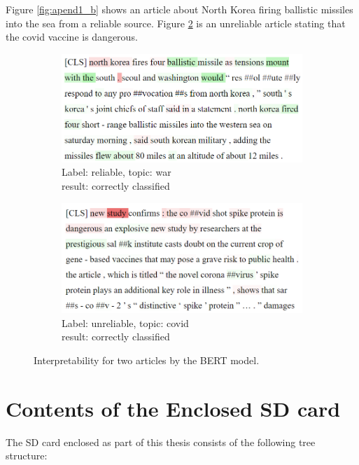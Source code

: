 Figure \ref{fig:apend1_b} shows an article about North Korea firing ballistic missiles into the sea from a reliable source. Figure \ref{fig:apend2_b} is an unreliable article stating that the covid vaccine is dangerous.


\begin{figure}[H]
    \centering
    \begin{subfigure}{.5\textwidth}
      \centering
      \includegraphics[width=\linewidth]{obrazky-figures/korea_weird.png}
      \caption{Label: reliable, topic: war \\result: correctly classified}
      \label{fig:apend2_a}
    \end{subfigure}%
    \begin{subfigure}{.5\textwidth}
      \centering
      \includegraphics[width=\linewidth]{obrazky-figures/covid2.png}
      \caption{Label: unreliable, topic: covid \\result: correctly classified}
      \label{fig:apend2_b}
    \end{subfigure}
    \caption{Interpretability for two articles by the BERT model.}
    \label{fig:apend2}
\end{figure}


\chapter{Contents of the Enclosed SD card}
The SD card enclosed as part of this thesis consists of the following tree structure: \\

